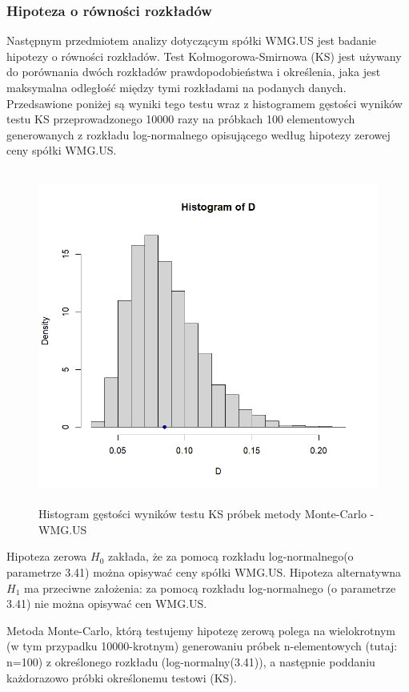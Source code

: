 \documentclass[a4paper,11pt]{article}
\begin{document}
\subsubsection{Hipoteza o równości rozkładów}
Następnym przedmiotem analizy dotyczącym spółki WMG.US jest badanie hipotezy o równości rozkładów. Test Kołmogorowa-Smirnowa (KS) jest używany do porównania dwóch rozkładów prawdopodobieństwa i określenia, jaka jest maksymalna odległość między tymi rozkładami na podanych danych. Przedsawione poniżej są wyniki tego testu wraz z histogramem gęstości wyników testu KS przeprowadzonego 10000 razy na próbkach 100 elementowych generowanych z rozkładu log-normalnego opisującego według hipotezy zerowej ceny spółki WMG.US.
\begin{figure}[h]
\centering
\includegraphics[width=12cm, height=11cm]{img/Histogram_of_D_WMG.png}
\caption{Histogram gęstości wyników testu KS próbek metody Monte-Carlo - WMG.US}
\end{figure}

Hipoteza zerowa \(H_0\) zakłada, że za pomocą rozkładu log-normalnego(o parametrze 3.41) można opisywać ceny spółki WMG.US. Hipoteza alternatywna \(H_1\) ma przeciwne założenia: za pomocą rozkładu log-normalnego (o parametrze 3.41) nie można opisywać cen WMG.US.

Metoda Monte-Carlo, którą testujemy hipotezę zerową polega na wielokrotnym (w tym przypadku 10000-krotnym) generowaniu próbek n-elementowych (tutaj: n=100) z określonego rozkładu  (log-normalny(3.41)), a następnie poddaniu każdorazowo próbki określonemu testowi (KS). 
\end{document}
